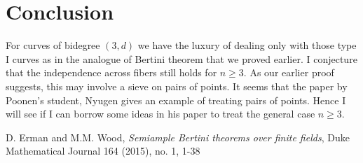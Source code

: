 \documentclass[12pt]{article}
\theoremstyle{plain}
\theoremstyle{definition}
\newcommand{\<}{\langle}
\renewcommand{\>}{\rangle}
\begin{document}
\section{Conclusion}
For curves of bidegree $(3, d)$ we have the luxury of dealing only with those type I curves as in the analogue of Bertini theorem that we proved earlier. I conjecture that the independence across fibers still holds for $n \ge 3$. As our earlier proof suggests, this may involve a sieve on pairs of points. It seems that the paper by Poonen's student, Nyugen gives an example of treating pairs of points. Hence I will see if I can borrow some ideas in his paper to treat the general case $n \ge 3$. 

\begin{thebibliography}{9}
D. Erman and M.M. Wood, \textit{Semiample Bertini theorems over finite fields}, Duke Mathematical Journal 164 (2015), no. 1, 1-38
\end{thebibliography}
\end{document}
